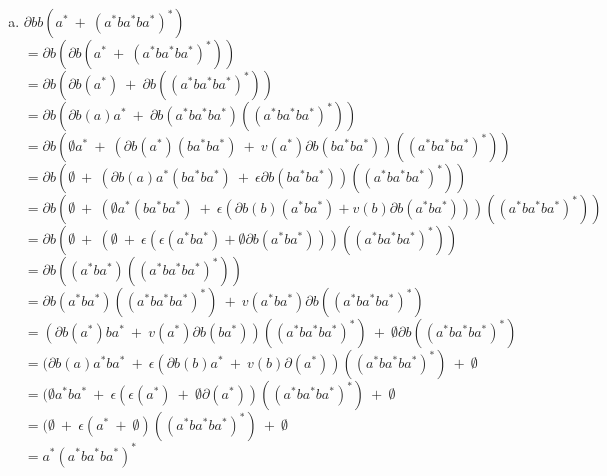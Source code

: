 \documentclass{article}
\begin{document}
\begin{enumerate}
{\begin{enumerate}[a)]
		\item{
		$\partial{bb} (a^* \ + \  (a^*ba^*ba^*)^*)$\\
		$= \partial{b} (\partial{b}(a^* \ + \  (a^*ba^*ba^*)^*))$\\
		$= \partial{b} (\partial{b}(a^*) \ + \  \partial{b}((a^*ba^*ba^*)^*))$\\
		$= \partial{b} (\partial{b}(a)a^* \ + \  \partial{b}(a^*ba^*ba^*)((a^*ba^*ba^*)^*))$\\
		$= \partial{b} (\emptyset a^* \ + \  (\partial{b}(a^*)(ba^*ba^*) \ + \ v(a^*)\partial{b} (ba^*ba^*))((a^*ba^*ba^*)^*))$\\	
		$= \partial{b} (\emptyset \ + \  (\partial{b}(a)a^*(ba^*ba^*) \ + \ \epsilon \partial{b} (ba^*ba^*))((a^*ba^*ba^*)^*))$\\
		$= \partial{b} (\emptyset \ + \  (\emptyset a^*(ba^*ba^*) \ + \ \epsilon (\partial{b}(b)(a^*ba^*) + v(b)\partial{b}(a^*ba^*)))((a^*ba^*ba^*)^*))$\\
		$= \partial{b} (\emptyset \ + \  (\emptyset  \ + \ \epsilon (\epsilon(a^*ba^*) + \emptyset \partial{b}(a^*ba^*)))((a^*ba^*ba^*)^*))$\\
		$= \partial{b} ((a^*ba^*)((a^*ba^*ba^*)^*))$\\
		$= \partial{b}(a^*ba^*)((a^*ba^*ba^*)^*) \ + \ v(a^*ba^*)\partial{b}((a^*ba^*ba^*)^*)$\\
		$= (\partial{b}(a^*)ba^* \ + \ v(a^*)\partial{b}(ba^*)) ((a^*ba^*ba^*)^*) \ + \ \emptyset \partial{b}((a^*ba^*ba^*)^*)$\\
		$= (\partial{b}(a)a^*ba^* \ + \ \epsilon(\partial{b}(b)a^* \ + \ v(b)\partial(a^*)) ((a^*ba^*ba^*)^*) \ + \ \emptyset $\\
		$= (\emptyset a^*ba^* \ + \ \epsilon(\epsilon(a^*) \ + \ \emptyset \partial(a^*)) ((a^*ba^*ba^*)^*) \ + \ \emptyset $\\
		$= (\emptyset \ + \ \epsilon(a^* \ + \ \emptyset)((a^*ba^*ba^*)^*) \ + \ \emptyset $\\
		$= a^*(a^*ba^*ba^*)^*$\\
				
		}
	

\end{enumerate}}
\end{enumerate}
\end{document}
